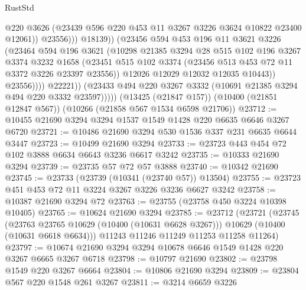 \begin{lexlean}{RustStd}
\begin{coremodule}
{\begin{coremodule}
{{{{{{{{{{{{{{{{{{{{{{{{{                                @220
                                @3626
                                (@23439 @596 @220 @453 @11 @3267 @3226 @3624 @10822 @23400 @12061))
                              @23556)))
                        @18139))
                    (@23456
                      @594
                      @453
                      @196
                      @11
                      @3621
                      @3226
                      (@23464
                        @594
                        @196
                        @3621
                        (@10298
                          @21385
                          @3294
                          @28
                          @515
                          @102
                          @196
                          @3267
                          @3374
                          @3232
                          @1658
                          (@23451
                            @515
                            @102
                            @3374
                            (@23456 @513 @453 @72 @11 @3372 @3226 @23397 @23556))
                          @12026
                          @12029
                          @12032
                          @12035
                          @10443))
                      @23556))))
              @22221))
          (@23433 @494 @220 @3267 @3332 (@10691 @21385 @3294 @494 @220 @3332 @23597)))))
    (@13425 (@21847 @157))
    (@10400 (@21851 @12847 @567))
    (@10266 (@21858 @567 @1534 @6598 @21706))
@23712 := @10455 @21690 @3294 @3294 @1537 @1549 @1428 @220 @6635 @6646 @3267 @6720
@23721 := @10486 @21690 @3294 @530 @1536 @337 @231 @6635 @6644 @3447
@23723 := @10499 @21690 @3294
@23733 := @23723 @443 @454 @72 @102 @3888 @6634 @6643 @3236 @6617 @3242
@23735 := @10333 @21690 @3294
@23739 := @23735 @57 @72 @57 @3888
@23740 := @10342 @21690
@23745 := @23733 (@23739 (@10341 (@23740 @57)) @13504)
@23755 := @23723 @451 @453 @72 @11 @3224 @3267 @3226 @3236 @6627 @3242
@23758 := @10387 @21690 @3294 @72
@23763 := @23755 (@23758 @450 @3224 @10398 @10405)
@23765 := @10624 @21690 @3294
@23785 := @23712
    (@23721
      (@23745
        (@23763 @23765 @10629 (@10400 (@10631 @6628 @3267)))
        @10629
        (@10400 (@10631 @6618 @6634)))
      @11243
      @11246
      @11249
      @11253
      @11258
      @11264)
@23797 := @10674 @21690 @3294 @3294 @10678 @6646 @1549 @1428 @220 @3267 @6665 @3267 @6718
@23798 := @10797 @21690
@23802 := @23798 @1549 @220 @3267 @6664
@23804 := @10806 @21690 @3294
@23809 := @23804 @567 @220 @1548 @261 @3267
@23811 := @3214 @6659 @3226
}}}}}}}}}}}}}}}}}}}}}}}}}
\end{coremodule}}
\end{coremodule}
\end{lexlean}
